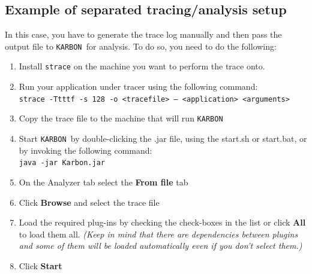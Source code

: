 \documentclass[12pt,a4paper]{scrreprt}
\newcommand{\karbon}{\texttt{KARBON {}}}
\begin{document}
\subsection{Example of separated tracing/analysis setup}
In this case, you have to generate the trace log manually and then pass the output file to \karbon for analysis. To do so, you need to do the following:
\begin{enumerate}
	\item Install {\tt strace} on the machine you want to perform the trace onto.
	\item Run your application under tracer using the following command:\\[0.2cm]
		{\tt strace -Ttttf -s 128 -o <tracefile> -- <application> <arguments>}
	\item Copy the trace file to the machine that will run \karbon
	\item Start \karbon by double-clicking the .jar file, using the start.sh or start.bat, or by invoking the following command:\\[0.2cm]
		{\tt java -jar Karbon.jar}
	\item On the Analyzer tab select the \textbf{From file} tab
	\item Click \textbf{Browse} and select the trace file
	\item Load the required plug-ins by checking the check-boxes in the list or click \textbf{All} to load them all. \textit{(Keep in mind that there are dependencies between plugins and some of them will be loaded automatically even if you don't select them.)}
	\item Click \textbf{Start}
\end{enumerate}
\end{document}
